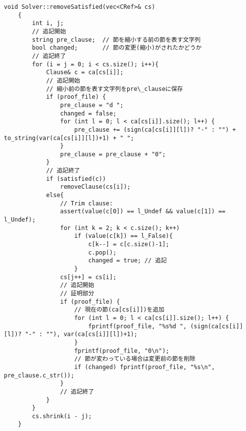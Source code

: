 \begin{lstlisting}[caption=関数removeSatisfiedの変更(core/solver.cc), firstnumber=601]
    void Solver::removeSatisfied(vec<CRef>& cs)
    {
        int i, j;
        // 追記開始
        string pre_clause;  // 節を縮小する前の節を表す文字列
        bool changed;       // 節の変更(縮小)がされたかどうか
        // 追記終了
        for (i = j = 0; i < cs.size(); i++){
            Clause& c = ca[cs[i]];
            // 追記開始
            // 縮小前の節を表す文字列をpre\_clauseに保存
            if (proof_file) {
                pre_clause = "d ";
                changed = false;
                for (int l = 0; l < ca[cs[i]].size(); l++) {
                    pre_clause += (sign(ca[cs[i]][l])? "-" : "") + to_string(var(ca[cs[i]][l])+1) + " ";
                }
                pre_clause = pre_clause + "0";
            }
            // 追記終了
            if (satisfied(c))
                removeClause(cs[i]);
            else{
                // Trim clause:
                assert(value(c[0]) == l_Undef && value(c[1]) == l_Undef);
                for (int k = 2; k < c.size(); k++)
                    if (value(c[k]) == l_False){
                        c[k--] = c[c.size()-1];
                        c.pop();
                        changed = true; // 追記
                    }
                cs[j++] = cs[i];
                // 追記開始
                // 証明部分
                if (proof_file) {
                    // 現在の節(ca[cs[i]])を追加
                    for (int l = 0; l < ca[cs[i]].size(); l++) {
                        fprintf(proof_file, "%s%d ", (sign(ca[cs[i]][l])? "-" : ""), var(ca[cs[i]][l])+1);
                    }
                    fprintf(proof_file, "0\n");
                    // 節が変わっている場合は変更前の節を削除
                    if (changed) fprintf(proof_file, "%s\n", pre_clause.c_str());
                }
                // 追記終了
            }
        }
        cs.shrink(i - j);
    }
\end{lstlisting}

